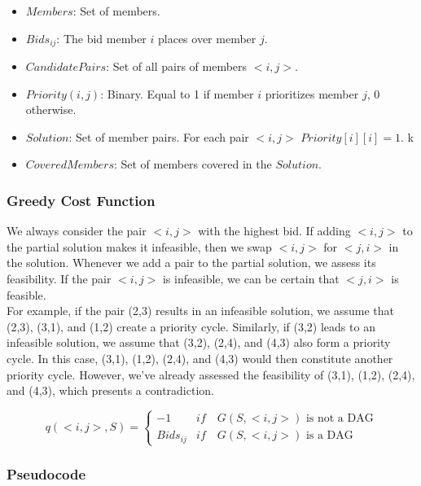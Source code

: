 \documentclass{article}
\begin{document}
\begin{itemize}
    \item $Members$: Set of members.
    \item $Bids_{ij}$: The bid member $i$ places over member $j$.
    \item $CandidatePairs$: Set of all pairs of members $<i,j>$.
    \item $Priority(i,j)$: Binary. Equal to 1 if member $i$ prioritizes member $j$, 0 otherwise.
    \item $Solution$: Set of member pairs. For each pair $<i,j>$ $Priority[i][i] = 1$.
k    \item $CoveredMembers$: Set of members covered in the $Solution$.
    
\end{itemize}

\subsubsection{Greedy Cost Function} \label{greedy_function}

We always consider the pair $<i,j>$ with the highest bid. If adding $<i,j>$ to the partial solution makes it infeasible, then we swap $<i,j>$ for $<j,i>$ in the solution.
Whenever we add a pair to the partial solution, we assess its feasibility. If the pair $<i,j>$ is infeasible, we can be certain that $<j,i>$ is feasible.\\
For example, if the pair (2,3) results in an infeasible solution, we assume that (2,3), (3,1), and (1,2) create a priority cycle. Similarly, if (3,2) leads to an infeasible solution, we assume that (3,2), (2,4), and (4,3) also form a priority cycle. In this case, (3,1), (1,2), (2,4), and (4,3) would then constitute another priority cycle. However, we've already assessed the feasibility of (3,1), (1,2), (2,4), and (4,3), which presents a contradiction.

\begin{displaymath}
    q(<i,j>, S) = \begin{cases}
    -1 & if \quad G(S, <i,j>) \textrm{ is not a DAG}\\
    Bids_{ij} & if \quad G(S, <i,j>) \textrm{ is a DAG}
    \end{cases}
\end{displaymath}

\subsubsection{Pseudocode}
\end{document}

